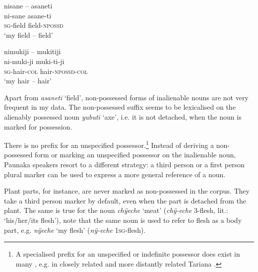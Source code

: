 \ea\label{ex:sane-asaneti}
\begingl 
\glpreamble nisane – asaneti\\
\gla ni-sane asane-ti\\ 
\textsc{sg}-field field-\textsc{npossd}\\ 
\glft ‘my field – field’\\ 
\endgl
\xe

\ea\label{ex:mukiji-mukitiji}
\begingl 
\glpreamble nimukiji – mukitiji\\
\gla ni-muki-ji muki-ti-ji\\ 
\textsc{sg}-hair-\textsc{col} hair-\textsc{npossd}-\textsc{col}\\ 
\glft ‘my hair – hair’\\ 
\endgl
\xe

%
Apart from \textit{asaneti} ‘field’, non-possessed forms of inalienable nouns are not very frequent in my data. The non-possessed suffix seems to be lexicalised on the alienably possessed noun \textit{yubuti} ‘axe’, i.e. it is not detached, when the noun is marked for possession.

There is no prefix for an unspecified possessor.\footnote{A specialised prefix for an unspecified or indefinite possessor does exist in many , e.g. in closely related   \citep[119--120]{Danielsen2007} and more distantly related Tariana \citep[123]{Aikhenvald2003}.} %
Instead of deriving a non-possessed form or marking an unspecified possessor on the inalienable noun, Paunaka speakers resort to a different strategy: a third person or a first person plural marker can be used to express a more general reference of a noun. 

Plant parts, for instance, are never marked as non-possessed in the corpus. They take a third person marker by default, even when the part is detached from the plant. The same is true for the noun \textit{chÿeche} ‘meat’ (\textit{chÿ-eche} 3-flesh, lit.: ‘his/her/its flesh’), note that the same noun is used to refer to flesh as a body part, e.g. \textit{nÿeche} ‘my flesh’ (\textit{nÿ-eche} 1\textsc{sg}-flesh).

